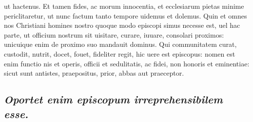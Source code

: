 \documentclass{article}
\begin{document}
\begin{pages}
ut hactenus. Et tamen fides, ac morum innocentia, et ecclesiarum pietas minime periclitaretur, ut nunc factum tanto tempore uidemus et dolemus. Quin et omnes nos Christiani homines nostro quoque modo episcopi simus necesse est, uel hac parte, ut officium nostrum sit uisitare, curare, iuuare, consolari proximos: unicuique enim de proximo suo mandauit dominus. Qui communitatem curat, custodit, nutrit, docet, fouet, fideliter regit, hic uere est episcopus: nomen est enim functio nis et operis, officii et sedulitatis, ac fidei, non honoris et eminentiae: sicut sunt antistes, praepositus, prior, abbas aut praeceptor.  \pend
{}
{}
\subsection*{\textit{Oportet enim episcopum irreprehensibilem esse. }}

\end{pages}
\end{document}
